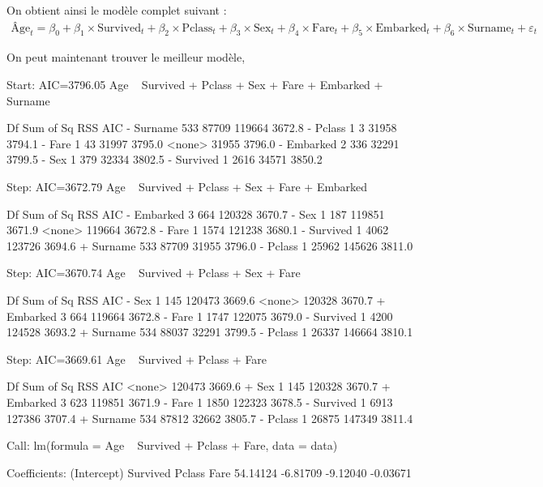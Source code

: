 \documentclass[11pt,french]{report}
\begin{document}
On obtient ainsi le modèle complet suivant :
\begin{align*}
\text{Âge}_t = \beta_0 + \beta_1 \times \text{Survived}_t + \beta_2 \times \text{Pclass}_t + \beta_3  \times \text{Sex}_t + \beta_4  \times \text{Fare}_t + \beta_5  \times \text{Embarked}_t + \beta_6  \times \text{Surname}_t + \varepsilon_t
\end{align*}

On peut maintenant trouver le meilleur modèle,

\begin{Schunk}
\begin{Soutput}
Start:  AIC=3796.05
Age ~ Survived + Pclass + Sex + Fare + Embarked + Surname

            Df Sum of Sq    RSS    AIC
- Surname  533     87709 119664 3672.8
- Pclass     1         3  31958 3794.1
- Fare       1        43  31997 3795.0
<none>                    31955 3796.0
- Embarked   2       336  32291 3799.5
- Sex        1       379  32334 3802.5
- Survived   1      2616  34571 3850.2

Step:  AIC=3672.79
Age ~ Survived + Pclass + Sex + Fare + Embarked

            Df Sum of Sq    RSS    AIC
- Embarked   3       664 120328 3670.7
- Sex        1       187 119851 3671.9
<none>                   119664 3672.8
- Fare       1      1574 121238 3680.1
- Survived   1      4062 123726 3694.6
+ Surname  533     87709  31955 3796.0
- Pclass     1     25962 145626 3811.0

Step:  AIC=3670.74
Age ~ Survived + Pclass + Sex + Fare

            Df Sum of Sq    RSS    AIC
- Sex        1       145 120473 3669.6
<none>                   120328 3670.7
+ Embarked   3       664 119664 3672.8
- Fare       1      1747 122075 3679.0
- Survived   1      4200 124528 3693.2
+ Surname  534     88037  32291 3799.5
- Pclass     1     26337 146664 3810.1

Step:  AIC=3669.61
Age ~ Survived + Pclass + Fare

            Df Sum of Sq    RSS    AIC
<none>                   120473 3669.6
+ Sex        1       145 120328 3670.7
+ Embarked   3       623 119851 3671.9
- Fare       1      1850 122323 3678.5
- Survived   1      6913 127386 3707.4
+ Surname  534     87812  32662 3805.7
- Pclass     1     26875 147349 3811.4
\end{Soutput}
\begin{Soutput}
Call:
lm(formula = Age ~ Survived + Pclass + Fare, data = data)

Coefficients:
(Intercept)     Survived       Pclass         Fare  
   54.14124     -6.81709     -9.12040     -0.03671  
\end{Soutput}
\end{Schunk}
\end{document}
